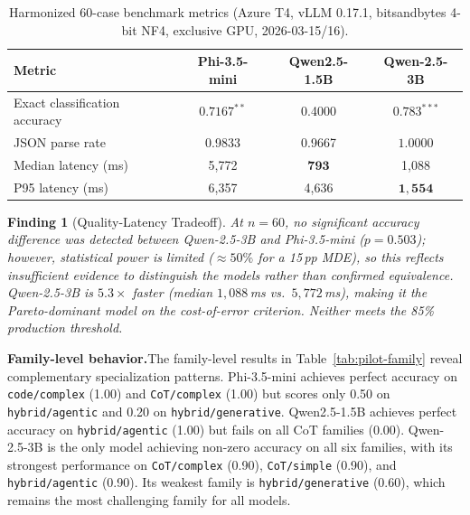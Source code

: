\documentclass{article}
\newtheorem{finding}{Finding}
\begin{document}
\begin{table}[htbp]
\centering
\caption{Harmonized 60-case benchmark metrics (Azure T4, vLLM 0.17.1, bitsandbytes 4-bit NF4, exclusive GPU, 2026-03-15/16).\protect\footnotemark}
\label{tab:pilot-overall}
\begin{tabular}{lccc}
\toprule
Metric & Phi-3.5-mini & Qwen2.5-1.5B & Qwen-2.5-3B \\
\midrule
Exact classification accuracy & $0.7167^{**}$ & 0.4000 & $\mathbf{0.783}^{***}$ \\
JSON parse rate & 0.9833 & 0.9667 & $\mathbf{1.0000}$ \\
Median latency (ms) & 5,772 & $\mathbf{793}$ & 1,088 \\
P95 latency (ms) & 6,357 & 4,636 & $\mathbf{1{,}554}$ \\
\bottomrule
\end{tabular}
\end{table}

\begin{finding}[Quality-Latency Tradeoff]
\label{find:tradeoff}
\emph{At $n = 60$, no significant accuracy difference was detected between Qwen-2.5-3B and Phi-3.5-mini ($p = 0.503$); however, statistical power is limited (${\approx}50\%$ for a 15\,pp MDE), so this reflects insufficient evidence to distinguish the models rather than confirmed equivalence. Qwen-2.5-3B is $5.3\times$ faster (median $1{,}088$\,ms vs.\ $5{,}772$\,ms), making it the Pareto-dominant model on the cost-of-error criterion. Neither meets the 85\% production threshold.}
\end{finding}

\textbf{Family-level behavior.}\quad The family-level results in Table~\ref{tab:pilot-family} reveal complementary specialization patterns. Phi-3.5-mini achieves perfect accuracy on \texttt{code/complex} (1.00) and \texttt{CoT/complex} (1.00) but scores only 0.50 on \texttt{hybrid/agentic} and 0.20 on \texttt{hybrid/generative}. Qwen2.5-1.5B achieves perfect accuracy on \texttt{hybrid/agentic} (1.00) but fails on all CoT families (0.00). Qwen-2.5-3B is the only model achieving non-zero accuracy on all six families, with its strongest performance on \texttt{CoT/complex} (0.90), \texttt{CoT/simple} (0.90), and \texttt{hybrid/agentic} (0.90). Its weakest family is \texttt{hybrid/generative} (0.60), which remains the most challenging family for all models.
\end{document}
